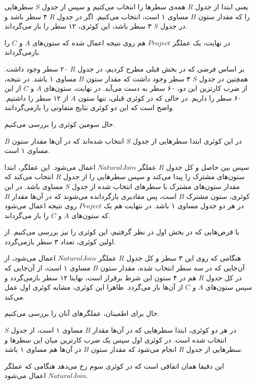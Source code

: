\begin{LTRbibitems}\end{LTRbibitems}

\begin{LTRbibitems}\end{LTRbibitems}

یعنی ابتدا از جدول
$R$
همه‌ی سطرها را انتخاب می‌کنیم و سپس از جدول
$S$
سطرهایی را که مقدار ستون
$B$
مساوی ۱ است، انتخاب می‌کنیم.
اگر در جدول
$R$
۴ سطر باشد و در جدول
$S$
۳ سطر باشد، این کوئری، ۱۲ سطر را باز می‌گرداند.

در نهایت، یک  عملگر
$Project$
هم روی نتیجه اعمال شده که ستون‌های
$A$
و
$C$
را بازمی‌گرداند.

بر اساس فرضی که در بخش قبلی مطرح کردیم،‌ در جدول
$R$
۲۰ سطر وجود داشت.
همچنین در جدول
$S$
۳ سطر وجود داشت که مقدار ستون
$B$
مساوی ۱ باشد.
در نتیجه، از ضرب کارتزین این دو، ۶۰ سطر به دست می‌آید.
در نهایت، ستون‌های   
$A$
و
$C$
از این ۶۰ سطر را داریم.
در حالی که در کوئری قبلی، تنها ستون 
$A$
از ۱۲ سطر را داشتیم.
واضح است که این دو کوئری نتایج متفاوتی را بازمی‌گردانند.


حال سومین کوئری را بررسی می‌کنیم.


در این کوئری ابتدا سطرهایی از جدول
$S$
انتخاب شده‌اند که در آن‌ها مقدار ستون
$B$
مساوی ۱ است.


سپس بین حاصل و کل جدول
$R$
عملگر
$Natural Join$
اعمال می‌شود.
این عملگر، ابتدا ستون‌های مشترک را پیدا می‌کند و سپس سطرهایی را از جدول
$R$
انتخاب می‌کند که مقدار ستون‌های مشترک با سطرهای انتخاب شده از جدول
$S$
مساوی باشد.
در این کوئری، ستون مشترک
$B$
است، پس مقادیری بازگردانده می‌شوند که در آن‌ها مقدار
$B$
در هر دو جدول مساوی ۱ باشد.
در نتهایت هم یک 
$Project$
روی نتیجه اعمال می‌شود که ستون‌های
$A$
و
$C$
را باز می‌گرداند.

با فرض‌هایی که در بخش اول در نظر گرفتیم، این کوئری را نیز بررسی می‌کنیم.
از اولین کوئری، تعداد ۳ سطر بازمی‌گردد.

هنگامی که روی این ۳ سطر و کل جدول
$R$
عملگر 
$Natural Join$
اعمال می‌شود، از آن‌جایی که در سه سطر انتخاب شده، مقدار ستون
$B$
مساوی ۱ است، از آن‌جایی که در کل جدول
$R$
هم  در ۴ ستون این شرط برقرار است، نهایتا ۱۲ سطر بازمی‌گردد و سپس ستون‌های
$A$
و
$C$
از آن‌ها باز می‌گردد.
ظاهرا این کوئری، مشابه کوئری اول عمل می‌کند.

حال برای اطمینان، عملگرهای آنان را بررسی می‌کنیم.

در هر دو کوئری، ابتدا سطرهایی که در آن‌ها مقدار
$B$
مساوی ۱ است، از جدول
$S$
انتخاب شده است.
در کوئری اول سپس یک ضرب کارتزین میان این سطرها و سطرهایی از جدول
$R$
انجام می‌شود که مقدار ستون
$B$
در آن‌ها هم مساوی ۱ باشد.

این دقیقا همان اتفاقی است که در کوئری سوم رخ می‌دهد هنگامی که عملگر
$Natural Join$
اعمال می‌شود.


